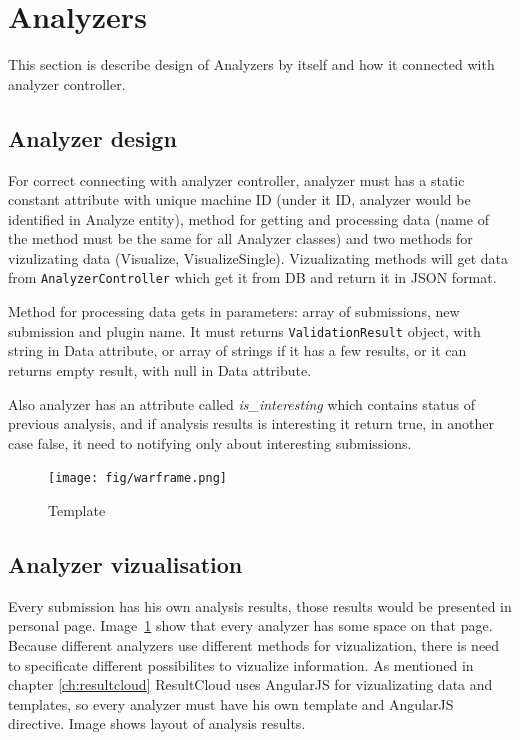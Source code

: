 \section{Analyzers}

This section is describe design of Analyzers by itself and how it connected with analyzer controller.

\subsection{Analyzer design}

For correct connecting with analyzer controller, analyzer must has a static constant attribute with unique machine ID (under it ID, analyzer would be identified in Analyze entity), method for getting and processing data (name of the method must be the same for all Analyzer classes) and two methods for vizulizating data (Visualize, VisualizeSingle). Vizualizating methods will get data from \texttt{AnalyzerController} which get it from DB and return it in JSON format.

Method for processing data gets in parameters: array of submissions, new submission and plugin name. It must returns \texttt{ValidationResult} object, with string in Data attribute, or array of strings if it has a few results, or it can returns empty result, with null in Data attribute.

Also analyzer has an attribute called \emph{is\_interesting} which contains status of previous analysis, and if analysis results is interesting it return true, in another case false, it need to notifying only about interesting submissions.

\begin{figure}
  \centering
    \texttt{[image: fig/warframe.png]}
  \caption{Template}
  \label{fig:temp}
\end{figure}

\subsection{Analyzer vizualisation}

Every submission has his own analysis results, those results would be presented in personal page. Image\ \ref{fig:temp} show that every analyzer has some space on that page. Because different analyzers use different methods for vizualization, there is need to specificate different possibilites to vizualize information. As mentioned in chapter \ref{ch:resultcloud} ResultCloud uses AngularJS for vizualizating data and templates, so every analyzer must have his own template and AngularJS  directive. Image shows layout of analysis results.

